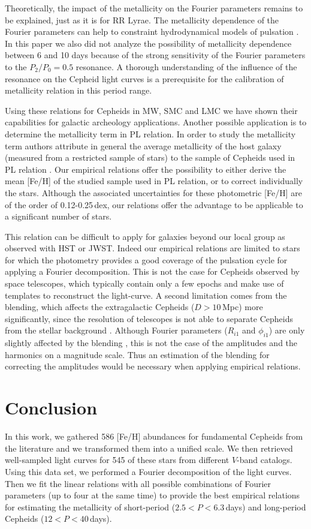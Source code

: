 \documentclass[article]{aa} %
\begin{document}
 Theoretically, the impact of the metallicity on the Fourier parameters remains to be explained, just as it is for RR Lyrae. The metallicity dependence of the Fourier parameters can help to constraint hydrodynamical models of pulsation \citep{Paxton2019}. In this paper we also did not analyze the possibility of metallicity dependence between 6 and 10 days because of the strong sensitivity of the Fourier parameters to the $P_2/P_0=0.5$ resonance. A thorough understanding of the influence of the resonance on the Cepheid light curves is a prerequisite for the calibration of metallicity relation in this period range.
 

Using these relations for Cepheids in MW, SMC and LMC we have shown their capabilities for galactic archeology applications.
Another possible application is to determine the metallicity term in PL relation. In order to study the metallicity term authors attribute in general the average metallicity of the host galaxy (measured from a restricted sample of stars) to the sample of Cepheids used in PL relation \citep[see, e.g.,][]{Breuval2022}. Our empirical relations offer the possibility to either derive the mean [Fe/H] of the studied sample used in PL relation, or to correct individually the stars. Although the associated uncertainties for these photometric [Fe/H] are of the order of 0.12-0.25$\,$dex, our relations offer the advantage to be applicable to a significant number of stars.


This relation can be difficult to apply for galaxies beyond our local group as observed with HST or JWST. Indeed our empirical relations are limited to stars for which the photometry provides a good coverage of the pulsation cycle for applying a Fourier decomposition. This is not the case for Cepheids observed by space telescopes, which typically contain only a few epochs and make use of templates to reconstruct the light-curve. A second limitation comes from the blending, which affects the extragalactic Cepheids ($D>10\,$Mpc) more significantly, since the resolution of telescopes is not able to separate Cepheids from the stellar background \citep[see, e.g.,][]{Mochejska2000,Riess2020}. Although Fourier parameters ($R_{i1}$ and $\phi_{i1}$) are only slightly affected by the blending \citep{Antonello2002}, this is not the case of the amplitudes and the harmonics on a magnitude scale. Thus an estimation of the blending for correcting the amplitudes would be necessary when applying empirical relations.


\section{Conclusion}\label{sect:conclusion}
In this work, we gathered 586 [Fe/H] abundances for fundamental Cepheids from the literature and we transformed them into a unified scale. We then retrieved well-sampled light curves for 545 of these stars from different $V$-band catalogs. Using this data set, we performed a Fourier decomposition of the light curves. Then we fit the linear relations with all possible combinations of Fourier parameters (up to four at the same time) to provide the best empirical relations for estimating the metallicity of short-period ($2.5<P<6.3\,$days) and long-period Cepheids ($12<P<40\,$days).
\end{document}
